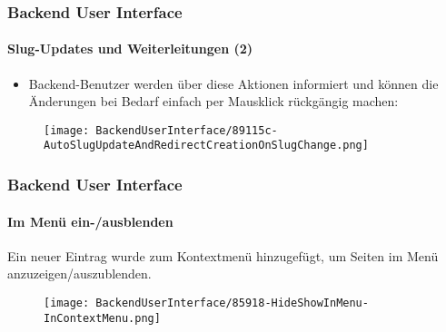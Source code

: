 
\begin{frame}[fragile]
	\frametitle{Backend User Interface}
	\framesubtitle{Slug-Updates und Weiterleitungen (2)}

	\begin{itemize}
		\item Backend-Benutzer werden über diese Aktionen informiert und können
			die Änderungen bei Bedarf einfach per Mausklick rückgängig machen:

	\end{itemize}

	\begin{figure}
		\texttt{[image: BackendUserInterface/89115c-AutoSlugUpdateAndRedirectCreationOnSlugChange.png]}
	\end{figure}

\end{frame}


\begin{frame}[fragile]
	\frametitle{Backend User Interface}
	\framesubtitle{Im Menü ein-/ausblenden}

	Ein neuer Eintrag wurde zum Kontextmenü hinzugefügt, um Seiten im Menü anzuzeigen/auszublenden.

	\begin{figure}
		\texttt{[image: BackendUserInterface/85918-HideShowInMenu-InContextMenu.png]}
	\end{figure}

\end{frame}

